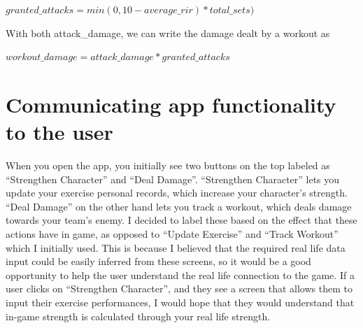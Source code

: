 \documentclass{l4proj}
\begin{document}
\begin{algorithm}
  $granted\_attacks = min(0, 10 - average\_rir) * total\_sets)$
\end{algorithm}

With both attack\_damage, we can write the damage dealt by a workout as 

\begin{algorithm}
  $workout\_damage = attack\_damage * granted\_attacks$ 
\end{algorithm}


\section{Communicating app functionality to the user}
When you open the app, you initially see two buttons on the top labeled as ``Strengthen Character'' and ``Deal Damage''. ``Strengthen Character'' lets you update your exercise personal records, which increase your character's strength. ``Deal Damage'' on the other hand lets you track a workout, which deals damage towards your team's enemy. I decided to label these based on the effect that these actions have in game, as opposed to ``Update Exercise'' and ``Track Workout'' which I initially used. This is because I believed that the required real life data input could be easily inferred from these screens, so it would be a good opportunity to help the user understand the real life connection to the game. If a user clicks on ``Strengthen Character'', and they see a screen that allows them to input their exercise performances, I would hope that they would understand that in-game strength is calculated through your real life strength. 
\end{document}
